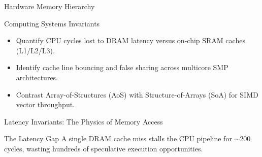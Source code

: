 
\begin{frame}{Hardware Memory Hierarchy}
  \begin{LearningGoals}{Computing Systems Invariants}
    \begin{itemize}\setlength{\itemsep}{.35em}
      \item Quantify CPU cycles lost to DRAM latency versus on-chip SRAM caches (L1/L2/L3).
      \item Identify cache line bouncing and false sharing across multicore SMP architectures.
      \item Contrast Array-of-Structures (AoS) with Structure-of-Arrays (SoA) for SIMD vector throughput.
    \end{itemize}
  \end{LearningGoals}
  \vspace{.15cm}
\end{frame}

\begin{frame}{Latency Invariants: The Physics of Memory Access}
  \vspace{.15cm}
  \begin{ConceptCard}{The Latency Gap}
    A single DRAM cache miss stalls the CPU pipeline for \(\sim 200\) cycles, wasting hundreds of speculative execution opportunities.
  \end{ConceptCard}
\end{frame}

